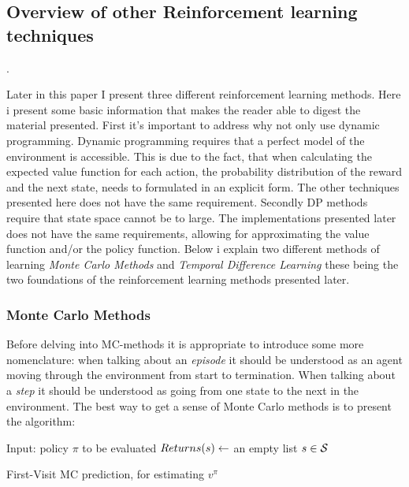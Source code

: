  \subsection{Overview of other Reinforcement learning techniques}.
 
Later in this paper I present three different reinforcement learning methods. Here i present some basic information that makes the reader able to digest the material presented. First it's important to address why not only use dynamic programming. Dynamic programming requires that a perfect model of the environment is accessible. This is due to the fact, that when calculating the expected value function for each action, the probability distribution of the reward and the next state, needs to formulated in an explicit form. The other techniques presented here does not have the same requirement. Secondly DP methods require that state space cannot be to large. The implementations presented later does not have the same requirements, allowing for approximating the value function and/or the policy function. Below i explain two different methods of learning \textit{Monte Carlo Methods} and \textit{Temporal Difference Learning} these being the two foundations of the reinforcement learning methods presented later.

\subsubsection{Monte Carlo Methods}

Before delving into MC-methods it is appropriate to introduce some more nomenclature: when talking about an \textit{episode} it should be understood as an agent moving through the environment from start to termination. When talking about a \textit{step} it should be understood as going from one state to the next in the environment. The best way to get a sense of Monte Carlo methods is to present the algorithm:

\begin{algorithm}[H]
\SetAlgoLined
{}
 Input: policy $\pi$ to be evaluated\;
 $Returns(s) \leftarrow$ an empty list $s \in \mathcal{S}$\; 
 \caption{First-Visit MC prediction, for estimating $v^{\pi}$}
 \label{alg:mcfirstvisit}
\end{algorithm}

